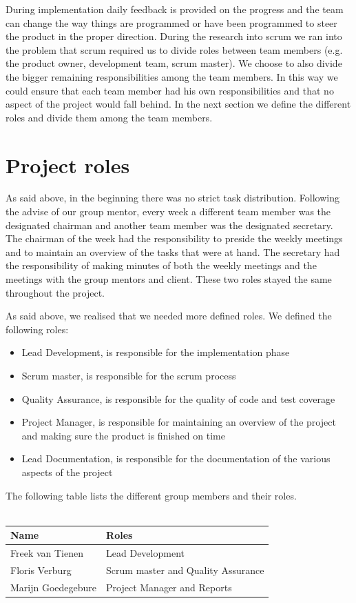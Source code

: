 During implementation daily feedback is provided on the progress and the team can change the way things are programmed or have been programmed to steer the product in the proper direction.
During the research into scrum we ran into the problem that scrum required us to divide roles between team members (e.g. the product owner, development team, scrum master).
We choose to also divide the bigger remaining responsibilities among the team members.
In this way we could ensure that each team member had his own responsibilities and that no aspect of the project would fall behind.
In the next section we define the different roles and divide them among the team members.

\section{Project roles}
As said above, in the beginning there was no strict task distribution.
Following the advise of our group mentor, every week a different team member was the designated chairman and another team member was the designated secretary.
The chairman of the week had the responsibility to preside the weekly meetings and to maintain an overview of the tasks that were at hand.
The secretary had the responsibility of making minutes of both the weekly meetings and the meetings with the group mentors and client.
These two roles stayed the same throughout the project.

As said above, we realised that we needed more defined roles.
We defined the following roles:
\begin{itemize}
\item Lead Development, is responsible for the implementation phase
\item Scrum master, is responsible for the scrum process
\item Quality Assurance, is responsible for the quality of code and test coverage
\item Project Manager, is responsible for maintaining an overview of the project and making sure the product is finished on time
\item Lead Documentation, is responsible for the documentation of the various aspects of the project
\end{itemize}

The following table lists the different group members and their roles.\\
\\
\begin{tabular}{|l|l|}
\hline
Name & Roles\\
\hline
Freek van Tienen & Lead Development\\
\hline
Floris Verburg & Scrum master and Quality Assurance\\
\hline
Marijn Goedegebure & Project Manager and Reports\\
\hline
\end{tabular}

